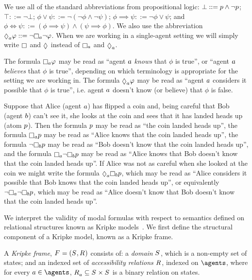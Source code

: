 We use all of the standard abbreviations from propositional logic:
$\bot ::= p \land \lnot p$;
$\top ::= \lnot \bot$;
$\phi \lor \psi ::= \lnot (\lnot \phi \land \lnot \psi)$;
$\phi \implies \psi ::= \lnot \phi \lor \psi$; and
$\phi \iff \psi ::= (\phi \implies \psi) \land (\psi \implies \phi)$.
We also use the abbreviation $\possibleA \phi ::= \lnot \necessaryA \lnot \phi$.
When we are working in a single-agent setting we will simply write $\necessary$ and $\possible$ instead of $\necessaryA$ and $\possibleA$.

The formula $\necessaryA \phi$ may be read as ``agent $a$ {\em knows} that $\phi$ is true'', or ``agent $a$ {\em believes} that $\phi$ is true'', depending on which terminology is appropriate for the setting we are working in.
The formula $\possibleA \phi$ may be read as ``agent $a$ considers it possible that $\phi$ is true'', i.e. agent $a$ doesn't know (or believe) that $\phi$ is false.

\begin{example}
Suppose that Alice (agent $a$) has flipped a coin and, being careful that Bob (agent $b$) can't see it, she looks at the coin and sees that it has landed heads up (atom $p$).
Then the formula $p$ may be read as ``the coin landed heads up'',
the formula $\knowsA \atomP$ may be read as ``Alice knows that the coin landed heads up'',
the formula $\lnot \knowsB \atomP$ may be read as ``Bob doesn't know that the coin landed heads up'',
and the formula $\knowsA \lnot \knowsB \atomP$ may be read as ``Alice knows that Bob doesn't know that the coin landed heads up''.
If Alice was not as careful when she looked at the coin we might write the formula $\possibleA \knowsB \atomP$, which may be read as ``Alice considers it possible that Bob knows that the coin landed heads up'', 
or equivalently $\lnot \knowsA \lnot \knowsB \atomP$, which may be read as ``Alice doesn't know that Bob doesn't know that the coin landed heads up''.
\end{example}

We interpret the validity of modal formulas with respect to semantics defined on relational structures known as Kripke models~\cite{tarski:1941,kripke:1959,hintikka:1962}.
We first define the structural component of a Kripke model, known as a Kripke frame.

\begin{definition}
A {\em Kripke frame}, $\kFrameAndTuple$ consists of:
a {\em domain} $\kStates$, which is a non-empty set of states; and
an indexed set of {\em accessibility relations} $\kAccessibilityRel$, indexed on $\agents$, where for every $\agentA \in \agents$, $\kAccessibilityA \subseteq \kStates \times \kStates$ is a binary relation on states.
\end{definition}

